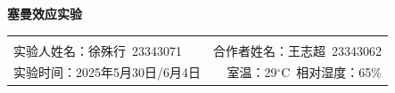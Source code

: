 \documentclass[12pt,a4paper,UTF8]{ctexart}
\begin{document}

\begin{center}
\LARGE\textbf{塞曼效应实验}
\end{center}

\begin{doublespacing}
	\begin{tabular}{lr}
	 & \\
	 {实验人姓名：徐殊行~23343071} & {合作者姓名：王志超~23343062}\\
	 {实验时间：2025年5月30日/6月4日} & {室温：29$^{\circ}$C~相对湿度：65\%}
	
	\end{tabular}
\end{doublespacing}

\begin{abstract}
  \noindent 塞曼效应实验旨在通过观测原子光谱在外加磁场下的分裂现象，验证原子磁矩与空间量子化，并测定电子荷质比 $e/m$、能级的量子数 $J$、磁量子数 $M$ 及郎德因子 $g$。
  实验采用笔型汞灯发射光源，通过电磁铁产生可调磁场，使用法布里–珀罗（Fabry–Pérot）标准具记录干涉花样。
  基于多光束干涉原理，测量在不同磁场强度下干涉环直径的微小变化，计算谱线的波长裂分，进而反推出电子的基本参数和原子能级信息。
  实验还利用偏振片区分 $\pi$ 线与 $\sigma^\pm$ 线，并研究横向与纵向观察条件下的谱线偏振特性。
  本实验不仅巩固了塞曼效应的理论基础，还培养了法布里–珀罗干涉测量技术和 CCD 图像处理能力，为进一步探究原子内部结构提供了实验手段。\cite{zhu1979atom,wu1978optics,xu1993modernphysics}

    \noindent \textbf{关键词：} 塞曼效应；法布里–珀罗标准具；荷质比；朗德因子；原子能级分裂；干涉测量；CCD 图像处理
		
\end{abstract}
	
\renewcommand{\abstractname}{Abstract}
\end{document}
